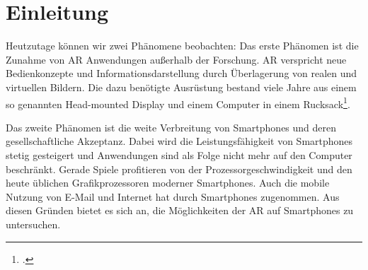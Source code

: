 \chapter{Einleitung} %
\label{cha:einleitung}

Heutzutage können wir zwei Phänomene beobachten: Das erste Phänomen ist die Zunahme von \gls{AR} Anwendungen außerhalb
 der Forschung. \gls{AR} verspricht neue Bedienkonzepte und Informationsdarstellung durch Überlagerung von realen und
 virtuellen Bil\-dern. Die dazu benötigte Ausrüstung bestand viele Jahre aus einem so genannten Head-mounted Display
 und einem Computer in einem Rucksack\footcite{azuma01}.

Das zweite Phänomen ist die weite Verbreitung von Smartphones und deren ge\-sell\-schaft\-liche Akzeptanz. Dabei wird
 die Leistungsfähigkeit von Smartphones stetig ge\-stei\-gert und Anwendungen sind als Folge nicht mehr auf den
 Computer beschränkt. Gerade Spiele profitieren von der Prozessor\-ge\-schwin\-dig\-keit und den heute üblichen
 Grafikprozessoren moderner Smartphones. Auch die mobile Nutzung von E-Mail und Internet hat durch Smartphones
 zugenommen. Aus diesen Gründen bietet es sich an, die Mög\-lich\-kei\-ten der \gls{AR} auf Smartphones zu untersuchen.





